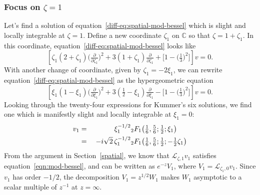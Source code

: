 \documentclass{article}
\theoremstyle{definition}
\newcommand{\C}{\mathbb{C}}
\newcommand{\laplace}{\mathcal{L}}
\begin{document}
\subsubsection{Focus on $\zeta = 1$}\label{pos-root}
Let's find a solution of equation~\eqref{diff-eq:spatial-mod-bessel} which is slight and locally integrable at $\zeta = 1$. Define a new coordinate $\zeta_1$ on $\C$ so that $\zeta = 1 + \zeta_1$. In this coordinate, equation~\eqref{diff-eq:spatial-mod-bessel} looks like
\begin{equation}%
\left[\zeta_1(2 + \zeta_1) \big(\tfrac{\partial}{\partial \zeta_1}\big)^2 + 3(1 + \zeta_1) \tfrac{\partial}{\partial \zeta_1} + \big[1 - \big(\tfrac{1}{3}\big)^2\big]\right] v = 0.
\end{equation}
With another change of coordinate, given by $\zeta_1 = -2\xi_1$, we can rewrite equation~\eqref{diff-eq:spatial-mod-bessel} as the hypergeometric equation
\begin{equation}\label{diff-eq:hypergeom-pos}
\left[\xi_1 (1 - \xi_1) \big(\tfrac{\partial}{\partial \xi_1}\big)^2 + 3(\tfrac{1}{2} - \xi_1) \tfrac{\partial}{\partial \xi_1} - \big[1 - \big(\tfrac{1}{3}\big)^2\big]\right] v = 0.
\end{equation}
Looking through the twenty-four expressions for Kummer's six solutions, we find one \cite[formula~15.10.12]{dlmf} which is manifestly slight and locally integrable at $\xi_1 = 0$:
\begin{alignat*}{2}
v_1 &=\;& \hphantom{-i\sqrt{2}}\,\xi_1^{-1/2} & {}_2F_1\big(\tfrac{1}{6}, \tfrac{5}{6}; \tfrac{1}{2}; \xi_1\big) \\
&=\;& -i\sqrt{2}\,\zeta_1^{-1/2} & {}_2F_1\big(\tfrac{1}{6}, \tfrac{5}{6}; \tfrac{1}{2}; -\tfrac{1}{2}\zeta_1\big)
\end{alignat*}
From the argument in Section~\ref{spatial}, we know that $\laplace_{\zeta, 1} v_1$ satisfies equation~\eqref{eqn:mod-bessel}, and can be written as $e^{-z} V_1$, where $V_1 = \laplace_{\zeta_1, 0} v_1$. Since $v_1$ has order $-1/2$, the decomposition $V_1 = z^{1/2} W_1$ makes $W_1$ asymptotic to a scalar multiple of $z^{-1}$ at $z = \infty$.
\end{document}
